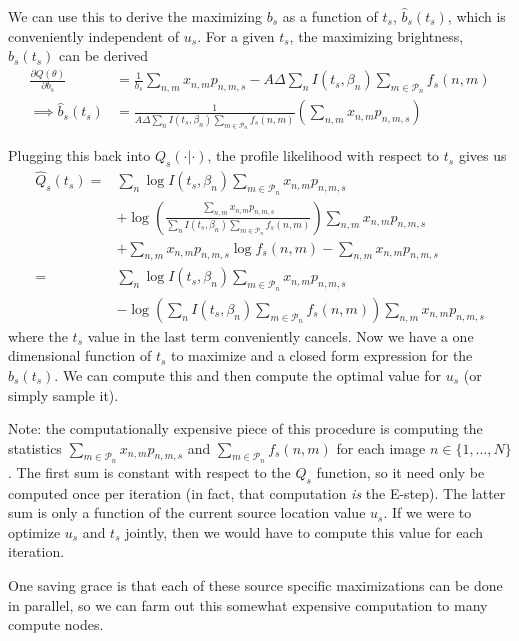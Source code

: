 \documentclass[11pt]{article}
\newcommand{\trans}{\intercal}
\begin{document}
\begin{itemize}
We can use this to derive the maximizing $b_s$ as a function of $t_s$, $\hat b_s(t_s)$, which is conveniently independent of $u_s$.  For a given $t_s$, the maximizing brightness, $\hat b_s(t_s)$ can be derived
\begin{align}
  \frac{\partial Q(\theta)}{\partial b_s} 
    &= \frac{1}{b_s} \sum_{n,m} x_{n,m} p_{n,m,s} - A \Delta \sum_{n} I(t_s, \beta_n) \sum_{m \in \mathcal{P}_n} f_s(n,m) \\
  \implies 
  \hat b_s(t_s) &= \frac{1}{A \Delta \sum_n I(t_s, \beta_n) \sum_{m \in \mathcal{P}_n} f_s(n,m)
} \left( \sum_{n,m} x_{n,m} p_{n,m,s} \right)  
\end{align}

Plugging this back into $Q_s(\cdot | \cdot)$, the profile likelihood with respect to $t_s$ gives us 
\begin{align}
  \hat Q_s(t_s) 
    =& \sum_{n} \log I(t_s, \beta_n) \sum_{m \in \mathcal{P}_n} x_{n,m} p_{n,m,s} \\
    & + \log\left( \frac{ \sum_{n,m} x_{n,m} p_{n,m,s} }{\sum_{n} I(t_s, \beta_n)\sum_{m \in \mathcal{P}_n} f_s(n,m)} \right) \sum_{n,m} x_{n,m} p_{n,m,s} \\
    & + \sum_{n,m} x_{n,m} p_{n,m,s} \log f_s(n,m) - \sum_{n,m} x_{n,m} p_{n,m,s} \\
    =& \sum_{n} \log I(t_s, \beta_n) \sum_{m\in \mathcal{P}_n} x_{n,m} p_{n,m,s} \\
    & - \log\left( \sum_{n} I(t_s, \beta_n) \sum_{m \in \mathcal{P}_n} f_s(n,m) \right) \sum_{n,m} x_{n,m} p_{n,m,s}
\end{align}
where the $t_s$ value in the last term conveniently cancels.  Now we have a one dimensional function of $t_s$ to maximize and a closed form expression for the $\hat b_s(t_s)$.  We can compute this and then compute the optimal value for $u_s$ (or simply sample it).  

Note: the computationally expensive piece of this procedure is computing the statistics $\sum_{m\in \mathcal{P}_n} x_{n,m} p_{n,m,s}$ and $\sum_{m \in \mathcal{P}_n} f_s(n,m)$ for each image $n \in \{1, \dots, N\}$.  The first sum is constant with respect to the $Q_s$ function, so it need only be computed once per iteration (in fact, that computation \emph{is} the E-step).  The latter sum is only a function of the current source location value $u_s$.  If we were to optimize $u_s$ and $t_s$ jointly, then we would have to compute this value for each iteration.    

One saving grace is that each of these source specific maximizations can be done in parallel, so we can farm out this somewhat expensive computation to many compute nodes.  
\end{itemize}
\end{document}

